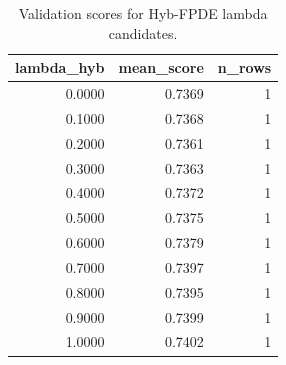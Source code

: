 \begin{table}[t]
\caption{Validation scores for Hyb-FPDE lambda candidates.}
\label{tab:lambda_distribution_computed}
\centering
\begin{tabular}{rrr}
\toprule
lambda\_hyb & mean\_score & n\_rows \\
\midrule
0.0000 & 0.7369 & 1 \\
0.1000 & 0.7368 & 1 \\
0.2000 & 0.7361 & 1 \\
0.3000 & 0.7363 & 1 \\
0.4000 & 0.7372 & 1 \\
0.5000 & 0.7375 & 1 \\
0.6000 & 0.7379 & 1 \\
0.7000 & 0.7397 & 1 \\
0.8000 & 0.7395 & 1 \\
0.9000 & 0.7399 & 1 \\
1.0000 & 0.7402 & 1 \\
\bottomrule
\end{tabular}

\end{table}

